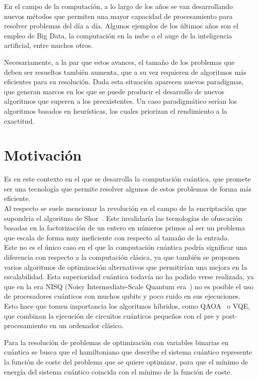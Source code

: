 En el campo de la computación, a lo largo de los años se van desarrollando nuevos métodos que permiten una mayor capacidad de procesamiento para resolver problemas del día a día.
Algunos ejemplos de los últimos años son el empleo de Big Data, la computación en la nube o el auge de la inteligencia artificial, entre muchos otros.

Necesariamente, a la par que estos avances, el tamaño de los problemas que deben ser resueltos también aumenta, que a su vez requieren de algoritmos más eficientes para su resolución.
Dada esta situación aparecen nuevos paradigmas, que generan marcos en los que se puede producir el desarrollo de nuevos algoritmos que superen a los preexistentes.
Un caso paradigmático serían los algoritmos basados en heurísticas, los cuales priorizan el rendimiento a la exactitud.

\section{Motivación}

Es en este contexto en el que se desarrolla la computación cuántica, que promete ser una tecnología que permite resolver algunos de estos problemas de forma más eficiente.
\\
Al respecto se suele mencionar la revolución en el campo de la encriptación que supondría el algoritmo de Shor~\cite{Shor_algorithm}.
Este invalidaría las tecnologías de ofuscación basadas en la factorización de un entero en números primos al ser un problema que escala de forma muy ineficiente con respecto al tamaño de la entrada.
\\
Este no es el único caso en el que la computación cuántica podría significar una diferencia con respecto a la computación clásica,
ya que también se proponen varios algoritmos de optimización alternativos que permitirían una mejora en la escalabilidad.
Esta superioridad cuántica todavía no ha podido verse realizada, ya que en la era NISQ (Noisy Intermediate-Scale Quantum era~\cite{Quantum_computing_in_the_NISQ_era_and_beyond}) no es posible el uso de procesadores cuánticos con muchos qubits y poco ruido en sus ejecuciones.
Esto hace que tomen importancia los algoritmos híbridos, como QAOA~\cite{qaoa_paper_original} o VQE, que combinan la ejecución de circuitos cuánticos pequeños con el pre y post-procesamiento en un ordenador clásico.

Para la resolución de problemas de optimización con variables binarias en cuántica se busca que el hamiltoniano que describe el sistema cuántico represente la función de coste del problema que se quiere optimizar, para que el mínimo de energía del sistema cuántico coincida con el mínimo de la función de coste.

